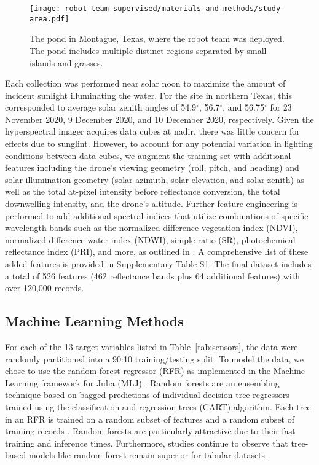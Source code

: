 \begin{figure}[H]
\centering
\vspace{-0.1in}
\hspace{-9pt}\texttt{[image: robot-team-supervised/materials-and-methods/study-area.pdf]}
\vspace{-0.1in}
\caption{The pond in Montague, Texas, where the robot team was deployed. The pond includes multiple distinct regions separated by small islands and grasses. \label{fig:study-area}}
\end{figure}  



Each collection was performed near solar noon to maximize the amount of incident sunlight illuminating the water. For the site in northern Texas, this corresponded to average solar zenith angles of 54.9$^{\circ}$, 56.7$^{\circ}$, and 56.75$^{\circ}$ for 23 November 2020, 9 December 2020, and 10 December 2020, respectively. Given the hyperspectral imager acquires data cubes at nadir, there was little concern for effects due to sunglint. However, to account for any potential variation in lighting conditions between data cubes, we augment the training set with additional features including the drone's viewing geometry (roll, pitch, and heading) and solar illumination geometry (solar azimuth, solar elevation, and solar zenith) as well as the total at-pixel intensity before reflectance conversion, the total downwelling intensity, and the drone's altitude. Further feature engineering is performed to add additional spectral indices that utilize combinations of specific wavelength bands such as the normalized difference vegetation index (NDVI), normalized difference water index (NDWI), simple ratio (SR), photochemical reflectance index (PRI), and more, as outlined in \cite{envi_vegetation_indices, thenkabail2018hyperspectral,kaufman1992atmospherically, SpectralIndexWheat}. A comprehensive list of these added features is provided in Supplementary Table S1. The final dataset includes a total of 526 features (462 reflectance bands plus 64 additional features) with over 120,000 records. 

\subsection{Machine Learning Methods}

For each of the 13 target variables listed in Table~\ref{tab:sensors}, the data were randomly partitioned into a 90:10 training/testing split. To model the data, we chose to use the random forest regressor (RFR) as implemented in the Machine Learning framework for Julia (MLJ) \cite{random-forest-regression, blaom2020mlj}.  Random forests are an ensembling technique based on bagged predictions of individual decision tree regressors trained using the classification and regression trees (CART) algorithm. Each tree in an RFR is trained on a random subset of features and a random subset of training records \cite{decision-trees, random-forest}. Random forests are particularly attractive due to their fast training and inference times. Furthermore, studies continue to observe that tree-based models like random forest remain superior for tabular datasets \cite{grinsztajn2022tree, shwartz2022tabular}.

